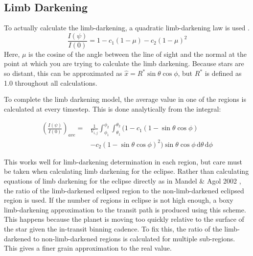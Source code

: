 

\subsection{Limb Darkening}
To actually calculate the limb-darkening, a quadratic limb-darkening law is used \cite{Claret2004}.
\begin{equation}
   \frac{I(\psi)}{I(0)} = 1 - c_1 (1 - \mu) - c_2 (1 - \mu)^2
\end{equation}
Here, $\mu$ is the cosine of the angle between the line of sight and the normal at the point at which you are trying to calculate the limb darkening. Because stars are so distant, this can be approximated as $\hat{x} = R^* \sin{\theta}\cos{\phi}$, but $R^{*}$ is defined as 1.0 throughout all calculations.

To complete the limb darkening model, the average value in one of the regions is calculated at every timestep. This is done analytically from the integral:

\begin{equation}
\begin{split}
    \left(\frac{I(\psi)}{I(0)}\right)_{ave} =&  \frac{1}{V_{i,j}} \int_{\phi_1}^{\phi_2}  \int_{\theta_1}^{\theta_2}  (1 - c_1 (1 - \sin{\theta}\cos{\phi}) \\ &- c_2 (1 - \sin{\theta}\cos{\phi})^2) \sin{\theta}\cos{\phi}\,\mathrm{d}\theta \, \mathrm{d}\phi
\end{split}
\end{equation}

This works well for limb-darkening determination in each region, but care must be taken when calculating limb darkening for the eclipse. Rather than calculating equations of limb darkening for the eclipse directly as in Mandel \& Agol 2002 \cite{MandelAgol2002}, the ratio of the limb-darkened eclipsed region to the non-limb-darkened eclipsed region is used. If the number of regions in eclipse is not high enough, a boxy limb-darkening approximation to the transit path is produced using this scheme. This happens because the planet is moving too quickly relative to the surface of the star given the in-transit binning cadence. To fix this, the ratio of the limb-darkened to non-limb-darkened regions is calculated for multiple sub-regions. This gives a finer grain approximation to the real value.

